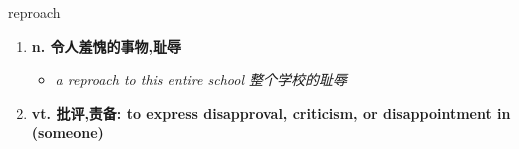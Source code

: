 
\begin{frame}
{\huge reproach}
\begin{center}
\begin{enumerate}\Large
  \item \textbf{n. 令人羞愧的事物,耻辱}
  \begin{itemize}
    \item \em{\Large{a reproach to this entire school 整个学校的耻辱}}
  \end{itemize}
  \item \textbf{vt. 批评,责备: to express disapproval, criticism, or disappointment in (someone)}
\end{enumerate}
\end{center}
\end{frame}
